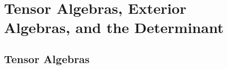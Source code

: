 \chapter{Tensor Algebras, Exterior Algebras, and the Determinant}
\vspace{12pt}
\section{Tensor Algebras}